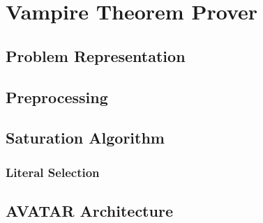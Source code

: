 \chapter{Vampire Theorem Prover}\label{chap:vampire-theorem-prover}
\section{Problem Representation}
\section{Preprocessing}
\section{Saturation Algorithm}
\subsection{Literal Selection}
\section{AVATAR Architecture}


